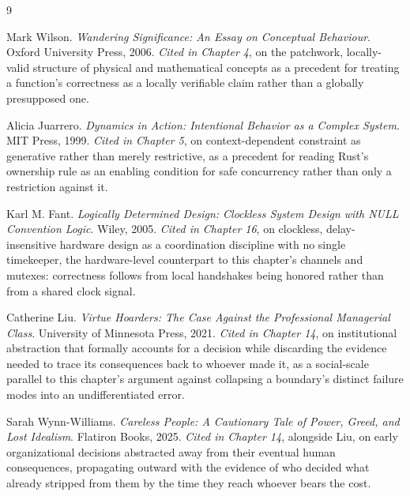 \documentclass[11pt]{book}
\begin{document}
\begin{thebibliography}{9}

Mark Wilson.
\textit{Wandering Significance: An Essay on Conceptual Behaviour}.
Oxford University Press, 2006.
\newline\emph{Cited in Chapter 4}, on the patchwork, locally-valid structure of physical and mathematical concepts as a precedent for treating a function's correctness as a locally verifiable claim rather than a globally presupposed one.

Alicia Juarrero.
\textit{Dynamics in Action: Intentional Behavior as a Complex System}.
MIT Press, 1999.
\newline\emph{Cited in Chapter 5}, on context-dependent constraint as generative rather than merely restrictive, as a precedent for reading Rust's ownership rule as an enabling condition for safe concurrency rather than only a restriction against it.

Karl M. Fant.
\textit{Logically Determined Design: Clockless System Design with NULL Convention Logic}.
Wiley, 2005.
\newline\emph{Cited in Chapter 16}, on clockless, delay-insensitive hardware design as a coordination discipline with no single timekeeper, the hardware-level counterpart to this chapter's channels and mutexes: correctness follows from local handshakes being honored rather than from a shared clock signal.

Catherine Liu.
\textit{Virtue Hoarders: The Case Against the Professional Managerial Class}.
University of Minnesota Press, 2021.
\newline\emph{Cited in Chapter 14}, on institutional abstraction that formally accounts for a decision while discarding the evidence needed to trace its consequences back to whoever made it, as a social-scale parallel to this chapter's argument against collapsing a boundary's distinct failure modes into an undifferentiated error.

Sarah Wynn-Williams.
\textit{Careless People: A Cautionary Tale of Power, Greed, and Lost Idealism}.
Flatiron Books, 2025.
\newline\emph{Cited in Chapter 14}, alongside Liu, on early organizational decisions abstracted away from their eventual human consequences, propagating outward with the evidence of who decided what already stripped from them by the time they reach whoever bears the cost.


\end{thebibliography}
\end{document}

